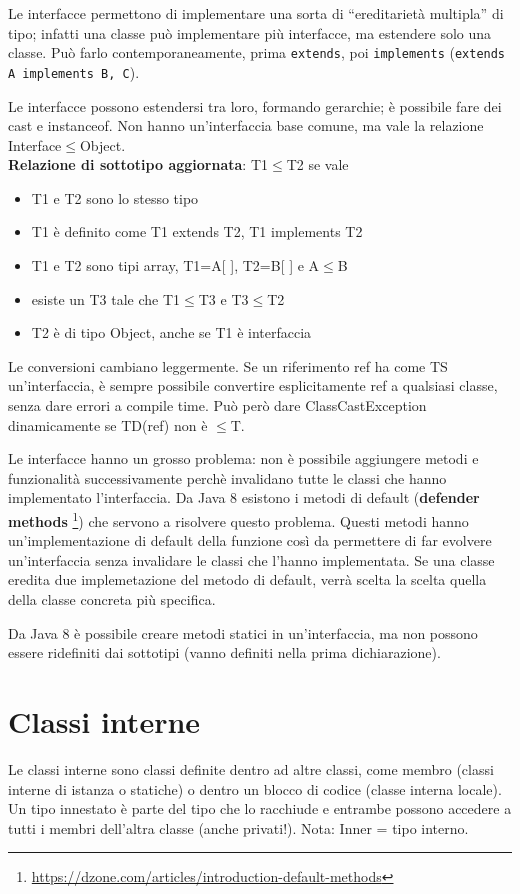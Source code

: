 Le interfacce permettono di implementare una sorta di “ereditarietà multipla” di tipo; infatti una classe può implementare più interfacce, ma estendere solo una classe. Può farlo contemporaneamente, prima \texttt{extends}, poi \texttt{implements} (\texttt{extends A implements B, C}).

Le interfacce possono estendersi tra loro, formando gerarchie; è possibile fare dei cast e instanceof. Non hanno un'interfaccia base comune, ma vale la relazione Interface$\le$Object. \\
\textbf{Relazione di sottotipo aggiornata}: T1$\le$T2 se vale
\begin{itemize}
\item T1 e T2 sono lo stesso tipo
\item T1 è definito come T1 extends T2, T1 implements T2
\item T1 e T2 sono tipi array, T1=A[ ], T2=B[ ] e A$\le$B
\item esiste un T3 tale che T1$\le$T3 e T3$\le$T2
\item T2 è di tipo Object, anche se T1 è interfaccia
\end{itemize}
Le conversioni cambiano leggermente. Se un riferimento ref ha come TS un'interfaccia, è sempre possibile convertire esplicitamente ref a qualsiasi classe, senza dare errori a compile time. Può però dare ClassCastException dinamicamente se TD(ref) non è $\le$T.

Le interfacce hanno un grosso problema: non è possibile aggiungere metodi e funzionalità successivamente perchè invalidano tutte le classi che hanno implementato l'interfaccia. Da Java 8 esistono i metodi di default (\textbf{defender methods} \footnote{\url{https://dzone.com/articles/introduction-default-methods}}) che servono a risolvere questo problema. Questi metodi hanno un'implementazione di default della funzione così da permettere di far evolvere un'interfaccia senza invalidare le classi che l'hanno implementata. Se una classe eredita due implemetazione del metodo di default, verrà scelta la scelta quella della classe concreta più specifica.

Da Java 8 è possibile creare metodi statici in un'interfaccia, ma non possono essere ridefiniti dai sottotipi (vanno definiti nella prima dichiarazione).

\section{Classi interne}
Le classi interne sono classi definite dentro ad altre classi, come membro (classi interne di istanza o statiche) o dentro un blocco di codice (classe interna locale). Un tipo innestato è parte del tipo che lo racchiude e entrambe possono accedere a tutti i membri dell'altra classe (anche privati!). Nota: Inner = tipo interno.

